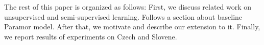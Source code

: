 \documentclass[11pt]{article}
\newcommand{\todojb}[1]{[\textbf{TODOJ} #1]} %
\begin{document}
The rest of this paper is organized as follows: First, we discuss related work on unsupervised and semi-supervised learning. Follows a section about baseline Paramor model. After that, we motivate and describe our extension to it. Finally, we report results of experiments on Czech and Slovene.


%
%
%
%
%
%
\end{document}
